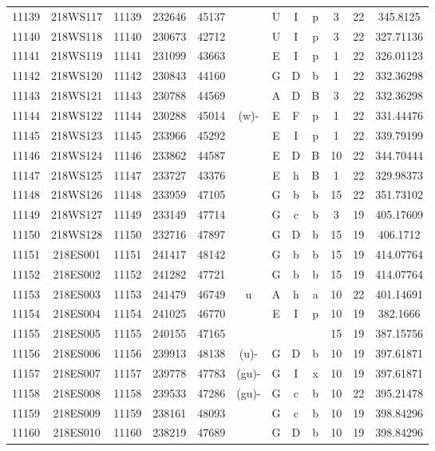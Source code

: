\begin{tabular}{|*{12}{c|}}
11139 & 218WS117 & 11139 & 232646 & 45137 &  & U & I & p & 3 & 22 & 345.8125 \\ 
11140 & 218WS118 & 11140 & 230673 & 42712 &  & U & I & p & 3 & 22 & 327.71136 \\ 
11141 & 218WS119 & 11141 & 231099 & 43663 &  & E & I & p & 1 & 22 & 326.01123 \\ 
11142 & 218WS120 & 11142 & 230843 & 44160 &  & G & D & b & 1 & 22 & 332.36298 \\ 
11143 & 218WS121 & 11143 & 230788 & 44569 &  & A & D & B & 3 & 22 & 332.36298 \\ 
11144 & 218WS122 & 11144 & 230288 & 45014 & (w)- & E & F & p & 1 & 22 & 331.44476 \\ 
11145 & 218WS123 & 11145 & 233966 & 45292 &  & E & I & p & 1 & 22 & 339.79199 \\ 
11146 & 218WS124 & 11146 & 233862 & 44587 &  & E & D & B & 10 & 22 & 344.70444 \\ 
11147 & 218WS125 & 11147 & 233727 & 43376 &  & E & h & B & 1 & 22 & 329.98373 \\ 
11148 & 218WS126 & 11148 & 233959 & 47105 &  & G & b & b & 15 & 22 & 351.73102 \\ 
11149 & 218WS127 & 11149 & 233149 & 47714 &  & G & c & b & 3 & 19 & 405.17609 \\ 
11150 & 218WS128 & 11150 & 232716 & 47897 &  & G & D & b & 15 & 19 & 406.1712 \\ 
11151 & 218ES001 & 11151 & 241417 & 48142 &  & G & b & b & 15 & 19 & 414.07764 \\ 
11152 & 218ES002 & 11152 & 241282 & 47721 &  & G & b & b & 15 & 19 & 414.07764 \\ 
11153 & 218ES003 & 11153 & 241479 & 46749 & u & A & h & a & 10 & 22 & 401.14691 \\ 
11154 & 218ES004 & 11154 & 241025 & 46770 &  & E & I & p & 10 & 19 & 382.1666 \\ 
11155 & 218ES005 & 11155 & 240155 & 47165 &  &  &  &  & 15 & 19 & 387.15756 \\ 
11156 & 218ES006 & 11156 & 239913 & 48138 & (u)- & G & D & b & 10 & 19 & 397.61871 \\ 
11157 & 218ES007 & 11157 & 239778 & 47783 & (gu)- & G & I & x & 10 & 19 & 397.61871 \\ 
11158 & 218ES008 & 11158 & 239533 & 47286 & (gu)- & G & c & b & 10 & 22 & 395.21478 \\ 
11159 & 218ES009 & 11159 & 238161 & 48093 &  & G & c & b & 10 & 19 & 398.84296 \\ 
11160 & 218ES010 & 11160 & 238219 & 47689 &  & G & D & b & 10 & 19 & 398.84296 \\ 

\end{tabular}
